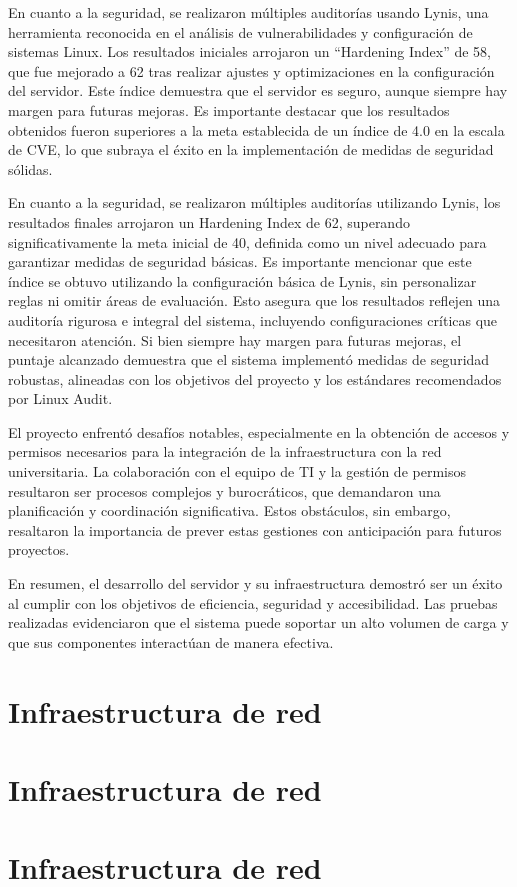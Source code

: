 En cuanto a la seguridad, se realizaron múltiples auditorías usando Lynis, una herramienta reconocida en el análisis de vulnerabilidades y configuración de sistemas Linux. Los resultados iniciales arrojaron un ``Hardening Index'' de 58, que fue mejorado a 62 tras realizar ajustes y optimizaciones en la configuración del servidor. Este índice demuestra que el servidor es seguro, aunque siempre hay margen para futuras mejoras. Es importante destacar que los resultados obtenidos fueron superiores a la meta establecida de un índice de 4.0 en la escala de CVE, lo que subraya el éxito en la implementación de medidas de seguridad sólidas.

En cuanto a la seguridad, se realizaron múltiples auditorías utilizando Lynis, los resultados finales arrojaron un Hardening Index de 62, superando significativamente la meta inicial de 40, definida como un nivel adecuado para garantizar medidas de seguridad básicas. Es importante mencionar que este índice se obtuvo utilizando la configuración básica de Lynis, sin personalizar reglas ni omitir áreas de evaluación. Esto asegura que los resultados reflejen una auditoría rigurosa e integral del sistema, incluyendo configuraciones críticas que necesitaron atención. Si bien siempre hay margen para futuras mejoras, el puntaje alcanzado demuestra que el sistema implementó medidas de seguridad robustas, alineadas con los objetivos del proyecto y los estándares recomendados por Linux Audit.

El proyecto enfrentó desafíos notables, especialmente en la obtención de accesos y permisos necesarios para la integración de la infraestructura con la red universitaria. La colaboración con el equipo de TI y la gestión de permisos resultaron ser procesos complejos y burocráticos, que demandaron una planificación y coordinación significativa. Estos obstáculos, sin embargo, resaltaron la importancia de prever estas gestiones con anticipación para futuros proyectos.

En resumen, el desarrollo del servidor y su infraestructura demostró ser un éxito al cumplir con los objetivos de eficiencia, seguridad y accesibilidad. Las pruebas realizadas evidenciaron que el sistema puede soportar un alto volumen de carga y que sus componentes interactúan de manera efectiva. 



\section{Infraestructura de red} 







\section{Infraestructura de red} 







\section{Infraestructura de red} 